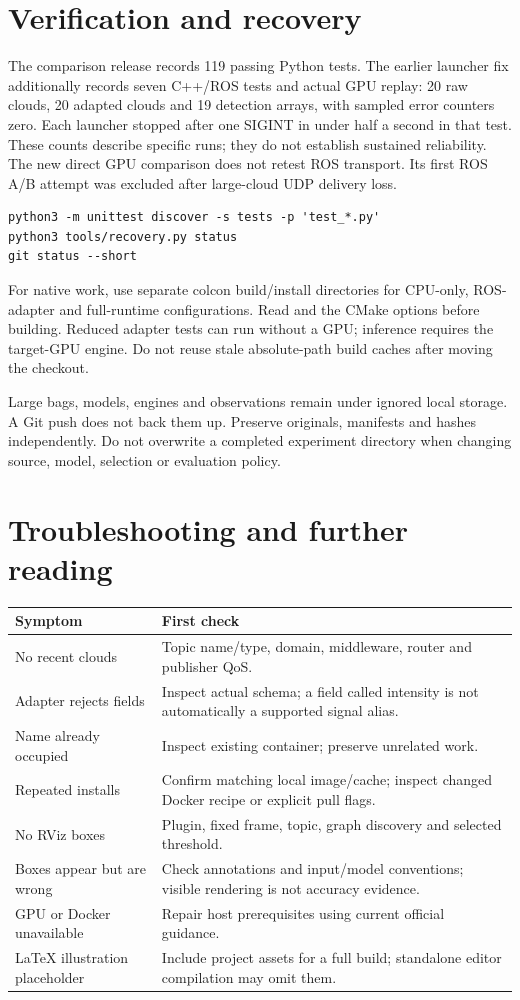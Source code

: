 \documentclass[11pt,a4paper]{article}
\begin{document}
\section{Verification and recovery}
The comparison release records 119 passing Python tests. The earlier launcher
fix additionally records seven C++/ROS tests and actual GPU replay: 20 raw clouds,
20 adapted clouds and 19 detection arrays, with sampled error counters zero.
Each launcher stopped after one SIGINT in under half a second in that test.
These counts describe specific runs; they do not establish sustained reliability.
The new direct GPU comparison does not retest ROS transport. Its first ROS A/B
attempt was excluded after large-cloud UDP delivery loss.
\begin{verbatim}
python3 -m unittest discover -s tests -p 'test_*.py'
python3 tools/recovery.py status
git status --short
\end{verbatim}
For native work, use separate colcon build/install directories for CPU-only,
ROS-adapter and full-runtime configurations. Read 
and the CMake options before building. Reduced adapter tests can run without a
GPU; inference requires the target-GPU engine. Do not reuse stale absolute-path
build caches after moving the checkout.

Large bags, models, engines and observations remain under ignored local storage.
A Git push does not back them up. Preserve originals, manifests and hashes
independently. Do not overwrite a completed experiment directory when changing
source, model, selection or evaluation policy.

\section{Troubleshooting and further reading}
\begin{longtable}{@{}p{.30\linewidth}p{.63\linewidth}@{}}
\toprule Symptom & First check \\ \midrule
No recent clouds & Topic name/type, domain, middleware, router and publisher QoS. \\
Adapter rejects fields & Inspect actual schema; a field called intensity is not automatically a supported signal alias. \\
Name already occupied & Inspect existing container; preserve unrelated work. \\
Repeated installs & Confirm matching local image/cache; inspect changed Docker recipe or explicit pull flags. \\
No RViz boxes & Plugin, fixed frame, topic, graph discovery and selected threshold. \\
Boxes appear but are wrong & Check annotations and input/model conventions; visible rendering is not accuracy evidence. \\
GPU or Docker unavailable & Repair host prerequisites using current official guidance. \\
LaTeX illustration placeholder & Include project assets for a full build; standalone editor compilation may omit them. \\
\bottomrule
\end{longtable}
\end{document}
